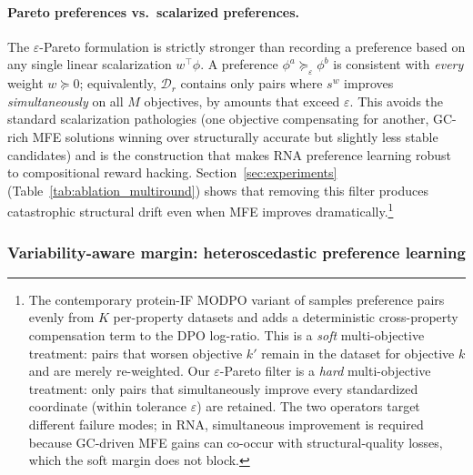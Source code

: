 \paragraph{Pareto preferences vs.~scalarized preferences.}
The $\varepsilon$-Pareto formulation is strictly stronger than recording a preference based on any single linear scalarization $w^\top\phi$. A preference $\phi^a \succeq_{\varepsilon} \phi^b$ is consistent with \emph{every} weight $w \succeq 0$; equivalently, $\mathcal{D}_r$ contains only pairs where $s^w$ improves \emph{simultaneously} on all $M$ objectives, by amounts that exceed $\varepsilon$. This avoids the standard scalarization pathologies (one objective compensating for another, GC-rich MFE solutions winning over structurally accurate but slightly less stable candidates) and is the construction that makes RNA preference learning robust to compositional reward hacking. Section~\ref{sec:experiments} (Table~\ref{tab:ablation_multiround}) shows that removing this filter produces catastrophic structural drift even when MFE improves dramatically.\footnote{The contemporary protein-IF MODPO variant of \citet{hou2026protalign} samples preference pairs evenly from $K$ per-property datasets and adds a deterministic cross-property compensation term to the DPO log-ratio. This is a \emph{soft} multi-objective treatment: pairs that worsen objective $k'$ remain in the dataset for objective $k$ and are merely re-weighted. Our $\varepsilon$-Pareto filter is a \emph{hard} multi-objective treatment: only pairs that simultaneously improve every standardized coordinate (within tolerance $\varepsilon$) are retained. The two operators target different failure modes; in RNA, simultaneous improvement is required because GC-driven MFE gains can co-occur with structural-quality losses, which the soft margin does not block.}

\subsubsection{Variability-aware margin: heteroscedastic preference learning}
\label{subsubsec:heteroscedastic}


